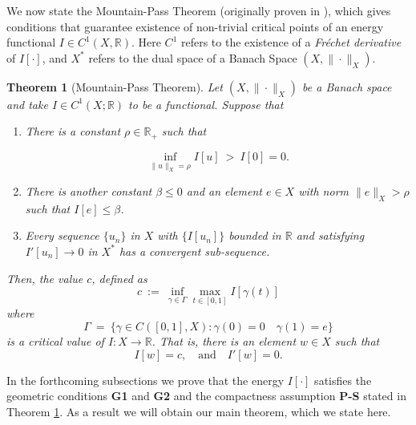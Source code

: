 \documentclass[11pt]{amsart}   	%
\theoremstyle{plain}
\numberwithin{equation}{section}
\newtheorem{theorem}[thm]{Theorem}
\def\be{\beta}
\def\R{\mathbb{R}}
\newcommand{\LC}[1]{{\color{purple} {\bf Loic:} [#1] }}
\newcommand{\JMS}[1]{{\color{orange} {\bf J. Siktar:} [#1] }}
\newcommand{\GJ}[1]{{\color{red} {\bf Gabriela:} [#1] }}
\begin{document}
We now state the Mountain-Pass Theorem (originally proven in \cite{rabinowitz1982mountain}), which gives conditions that guarantee existence of non-trivial critical points of an energy functional $I \in C^1(X,\R)$. Here $C^1$ refers to the existence of a \textit{Fréchet derivative} of $I[\cdot]$, and $X^*$ refers to the dual space of a Banach Space $(X, \|\cdot\|_X)$.

\begin{theorem}[Mountain-Pass Theorem]\label{t:mountain-pass} 
Let $(X, \|\cdot\|_X)$ be a Banach space and take $I \in C^1(X; \R)$ to be a functional. Suppose that
\begin{enumerate}
\item[\bf G1] There is a constant $\rho \in \R_+$ such that

\[ \inf_{\|u\|_X=\rho} I[u] \ > \ I[0]=0 .\] 
\item[\bf G2] There is another constant $\be \leq 0$ and an element $e \in X$ with norm $\| e\|_{X} > \rho$ such that $I[e] \leq \be $.
\item[\bf P-S] Every sequence $\{u_n\}$ in $X$ with $\{ I[u_n]\}$ bounded in $\R$ and satisfying $I'[u_n] \to 0$ in $X^*$ has a convergent sub-sequence.
\end{enumerate}
Then, the value $c$, defined as
\begin{equation}\label{e:critical_value}
 c \ := \ \inf_{\gamma \in \Gamma} \max_{t \in [0,1]} I[\gamma(t)]
 \end{equation}
where
\[ \Gamma \ = \ \{ \gamma \in C([0,1], X): \gamma(0) = 0 \quad \gamma(1) = e\}\]
is a critical value of $I:X \longrightarrow \R$. That is, there is an element $w \in X$ such that
\[ I[w] = c, \quad \text{and} \quad I'[w] =0.\]
\end{theorem}








%


In the forthcoming subsections we prove that the energy $I[\cdot]$ satisfies the geometric conditions {\bf G1} and {\bf G2} and the compactness assumption {\bf P-S} stated in Theorem \ref{t:mountain-pass}. As a result we will obtain our main theorem, which we state here.
\end{document}
